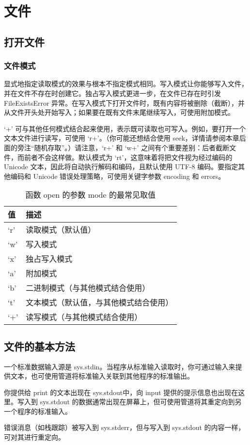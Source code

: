 \chapter{文件\label{ch11}}
\section{打开文件}
\subsection{文件模式}
显式地指定读取模式的效果与根本不指定模式相同。写入模式让你能够写入文件，并在文件不存在时创建它。独占写入模式更进一步，在文件已存在时引发 FileExistsError 异常。在写入模式下打开文件时，既有内容将被删除（截断），并从文件开头处开始写入；如果要在既有文件末尾继续写入，可使用附加模式。

`+' 可与其他任何模式结合起来使用，表示既可读取也可写入。例如，要打开一个文本文件进行读写，可使用 `r+'。（你可能还想结合使用 seek，详情请参阅本章后面的旁注“随机存取”。）请注意，`r+' 和 `w+' 之间有个重要差别：后者截断文件，而前者不会这样做。默认模式为 `rt'，这意味着将把文件视为经过编码的 Unicode 文本，因此将自动执行解码和编码，且默认使用 UTF-8 编码。要指定其他编码和 Unicode 错误处理策略，可使用关键字参数 encoding 和 errors。
\begin{table}
    \centering
    \caption{函数 open 的参数 mode 的最常见取值}
    \label{tbl11-1}
    \begin{tabular}{ll}
        \hline
        值   & 描述                  \\
        \hline
        `r' & 读取模式（默认值）           \\
        `w' & 写入模式                \\
        `x' & 独占写入模式              \\
        `a' & 附加模式                \\
        `b' & 二进制模式（与其他模式结合使用）    \\
        `t' & 文本模式（默认值，与其他模式结合使用） \\
        `+' & 读写模式（与其他模式结合使用）     \\
        \hline
    \end{tabular}
\end{table}
\section{文件的基本方法}
\begin{tcolorbox}[title=三个标准流]
    一个标准数据输入源是 sys.stdin。当程序从标准输入读取时，你可通过输入来提供文本，也可使用管道将标准输入关联到其他程序的标准输出。

    你提供给 print 的文本出现在 sys.stdout中，向 input 提供的提示信息也出现在这里。写入到 sys.stdout 的数据通常出现在屏幕上，但可使用管道将其重定向到另一个程序的标准输入。

    错误消息（如栈跟踪）被写入到 sys.stderr，但与写入到 sys.stdout 的内容一样，可对其进行重定向。
\end{tcolorbox}


